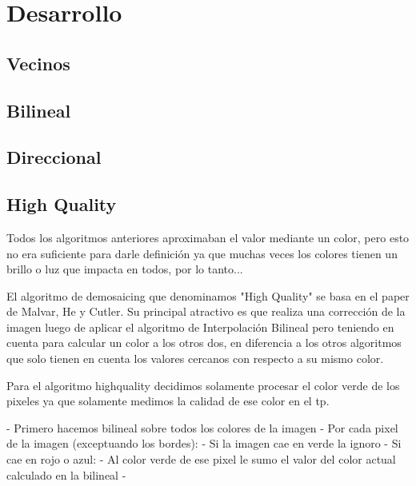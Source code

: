 \section{Desarrollo}

\subsection{Vecinos}

\subsection{Bilineal}

\subsection{Direccional}

\subsection{High Quality}

Todos los algoritmos anteriores aproximaban el valor mediante un color, pero esto no era suficiente para darle definición ya que muchas veces los colores tienen un brillo o luz que impacta en todos, por lo tanto... 

El algoritmo de demosaicing que denominamos "High Quality" se basa en el paper de Malvar, He y Cutler. Su principal atractivo es que realiza una corrección de la imagen luego de aplicar el algoritmo de Interpolación Bilineal pero teniendo en cuenta para calcular un color a los otros dos, en diferencia a los otros algoritmos que solo tienen en cuenta los valores cercanos con respecto a su mismo color.



Para el algoritmo highquality decidimos solamente procesar el color verde de los pixeles ya que solamente medimos la calidad de ese color en el tp.

- Primero hacemos bilineal sobre todos los colores de la imagen
- Por cada pixel de la imagen (exceptuando los bordes):
	- Si la imagen cae en verde la ignoro
	- Si cae en rojo o azul:
		- Al color verde de ese pixel le sumo el valor del color actual calculado en la bilineal
		- 
		
	


